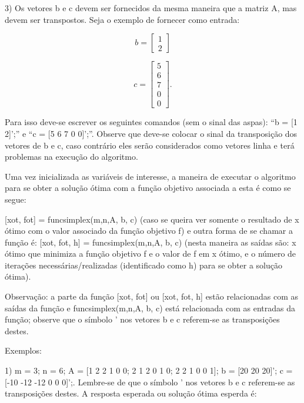 \documentclass[10pt]{article}
\begin{document}
3) Os vetores b e c devem ser fornecidos da mesma maneira que a matriz A, mas devem ser transpostos. Seja o exemplo de fornecer como entrada:

\[
b = 
  \begin{bmatrix}
	1\\
	2
  \end{bmatrix}
\]

\[
c = 
  \begin{bmatrix}
	5\\
	6\\
	7\\
	0\\
	0
  \end{bmatrix}.
\]

Para isso deve-se escrever os seguintes comandos (sem o sinal das aspas): ``b = [1 2]';'' e ``c = [5 6 7 0 0]';''. Observe que deve-se colocar o sinal da transposição dos vetores de b e c, caso contrário eles serão considerados como vetores linha e terá problemas na execução do algoritmo.
\newline

Uma vez inicializada as variáveis de interesse, a maneira de executar o algoritmo para se obter a solução ótima com a função objetivo associada a esta é como se segue:
\newline

[xot, fot] = funcsimplex(m,n,A, b, c) (caso se queira ver somente o resultado de x ótimo com o valor associado da função objetivo f) e outra forma de se chamar a função é: [xot, fot, h] = funcsimplex(m,n,A, b, c) (nesta maneira as saídas são: x ótimo que minimiza a função objetivo f e o valor de f em x ótimo, e o número de iterações necessárias/realizadas (identificado como h) para se obter a solução ótima).
\newline

Observação: a parte da função [xot, fot] ou [xot, fot, h] estão relacionadas com as saídas da função e funcsimplex(m,n,A, b, c) está relacionada com as entradas da função; observe que o símbolo ' nos vetores b e c referem-se as transposições destes.

Exemplos:
\newline

1)
m = 3; n = 6; A = [1 2 2 1 0 0; 2 1 2 0 1 0; 2 2 1 0 0 1]; b = [20 20 20]'; c = [-10 -12 -12 0 0 0]';. Lembre-se de que o símbolo ' nos vetores b e c referem-se as transposições destes. A resposta esperada ou solução ótima esperda é:
\newline
\end{document}
